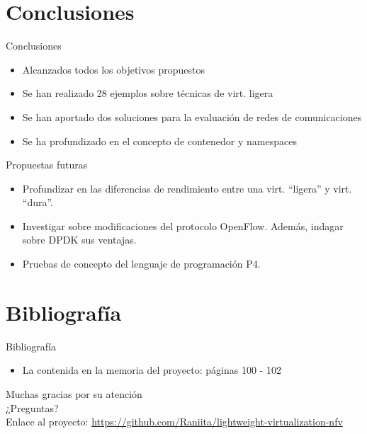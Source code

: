 \documentclass[aspectratio=169,xcolor=dvipsnames]{beamer}
\begin{document}
	
	\section{Conclusiones}
	
	\begin{frame}{Conclusiones}
		\begin{itemize}
		    \item Alcanzados todos los objetivos propuestos
		    \item Se han realizado 28 ejemplos sobre técnicas de virt. ligera
		    \item Se han aportado dos soluciones para la evaluación de redes de comunicaciones
		    \item Se ha profundizado en el concepto de contenedor y namespaces
		\end{itemize}
		
		\begin{exampleblock}{Propuestas futuras}
		    \begin{itemize}
		        \item Profundizar en las diferencias de rendimiento entre una virt. ``ligera'' y virt. ``dura''.
		        \item Investigar sobre modificaciones del protocolo OpenFlow. Además, indagar sobre DPDK sus ventajas.
		        \item Pruebas de concepto del lenguaje de programación P4.
		    \end{itemize}
		\end{exampleblock}
	\end{frame}

	
	\section{Bibliografía}
	
	\begin{frame}{Bibliografía}
		\begin{itemize}
		    \item La contenida en la memoria del proyecto: páginas 100 - 102
		\end{itemize}
	\end{frame}
	
	\begin{frame}
	    \begin{center}
	        \vspace{30px}
	        \Large Muchas gracias por su atención \\
	        \vspace{30px}
	        \large ¿Preguntas? \\
	        \vspace{60px}
	        Enlace al proyecto: \small \url{https://github.com/Raniita/lightweight-virtualization-nfv}
	    \end{center}
	\end{frame}
	
\end{document}
